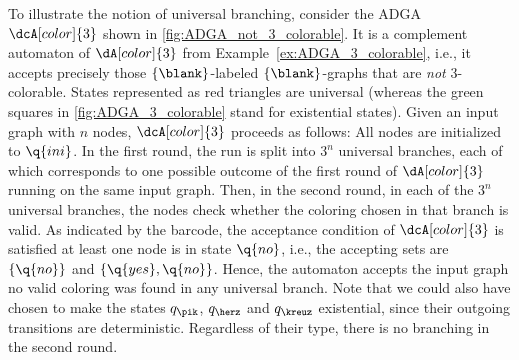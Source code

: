 \documentclass[a4paper,11pt,twoside]{report} \pdfoutput=1
\begin{document}
\begin{example*}
  To illustrate the notion of universal branching, consider the ADGA
  $\dcA[color]{3}$ shown in \cref{fig:ADGA_not_3_colorable}. It is a
  complement automaton of $\dA[color]{3}$ from
  Example~\ref{ex:ADGA_3_colorable}, i.e., it accepts precisely those
  $\{\blank\}$-labeled $\{\blank\}$-graphs that are \emph{not}
  3-colorable. States represented as red triangles are universal
  (whereas the green squares in \cref{fig:ADGA_3_colorable} stand for
  existential states). Given an input graph with $n$ nodes,
  $\dcA[color]{3}$ proceeds as follows: All nodes are initialized to
  $\q{ini}$. In the first round, the run is split into $3^n$ universal
  branches, each of which corresponds to one possible outcome of the
  first round of $\dA[color]{3}$ running on the same input
  graph. Then, in the second round, in each of the $3^n$ universal
  branches, the nodes check whether the coloring chosen in that branch
  is valid. As indicated by the barcode, the acceptance condition of
  $\dcA[color]{3}$ is satisfied \Iff at least one node is in state
  $\q{no}$, i.e., the accepting sets are $\{\q{no}\}$ and
  $\{\q{yes},\q{no}\}$. Hence, the automaton accepts the input graph
  \Iff no valid coloring was found in any universal branch. Note that
  we could also have chosen to make the states $q_\pik$, $q_\herz$ and
  $q_\kreuz$ existential, since their outgoing transitions are
  deterministic. Regardless of their type, there is no branching in
  the second round.
\end{example*}
\end{document}
